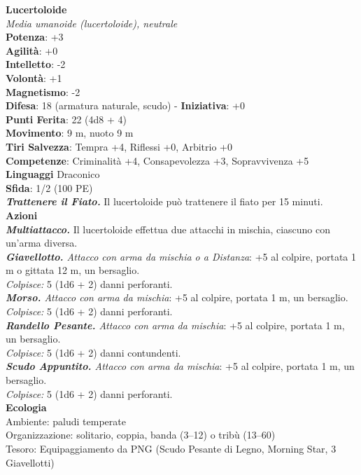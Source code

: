 \begin{multicols}{2}
\medskip\textbf{Lucertoloide}\\
\emph{Media umanoide (lucertoloide), neutrale}\\
\textbf{Potenza}: +3\\
\textbf{Agilità}: +0\\
\textbf{Intelletto}: -2\\
\textbf{Volontà}: +1\\
\textbf{Magnetismo}: -2\\
\textbf{Difesa}: 18 (armatura naturale, scudo) - \textbf{Iniziativa}: +0\\
\textbf{Punti Ferita}: 22 (4d8 + 4)\\
\textbf{Movimento}: 9 m, nuoto 9 m\\
\textbf{Tiri Salvezza}: Tempra +4, Riflessi +0, Arbitrio +0\\
\textbf{Competenze}: Criminalità +4, Consapevolezza +3, Sopravvivenza +5\\
\textbf{Linguaggi} Draconico\\
\textbf{Sfida}: 1/2 (100 PE)\smallskip\\

\emph{\textbf{Trattenere il Fiato.}} Il lucertoloide può trattenere il fiato per 15 minuti.\\
\smallskip\textbf{Azioni}\\
\emph{\textbf{Multiattacco.}} Il lucertoloide effettua due attacchi in mischia, ciascuno con un'arma diversa.\\
\emph{\textbf{Giavellotto.} Attacco con arma da mischia o a Distanza}: +5 al colpire, portata 1 m o gittata 12 m, un bersaglio. \\
\emph{Colpisce:} 5 (1d6 + 2) danni perforanti.\\
\emph{\textbf{Morso.} Attacco con arma da mischia}: +5 al colpire, portata 1 m, un bersaglio.\\
\emph{Colpisce:} 5 (1d6 + 2) danni perforanti.\\
\emph{\textbf{Randello Pesante.} Attacco con arma da mischia}: +5 al colpire, portata 1 m, un bersaglio.\\
\emph{Colpisce:} 5 (1d6 + 2) danni contundenti. \\
\emph{\textbf{Scudo Appuntito.} Attacco con arma da mischia}: +5 al colpire, portata 1 m, un bersaglio.\\
\emph{Colpisce:} 5 (1d6 + 2) danni perforanti.\\
\textbf{Ecologia}\\
Ambiente: paludi temperate\\
Organizzazione: solitario, coppia, banda (3–12) o tribù (13–60)\\
Tesoro: Equipaggiamento da PNG (Scudo Pesante di Legno, Morning Star, 3 Giavellotti)\\


\end{multicols}
